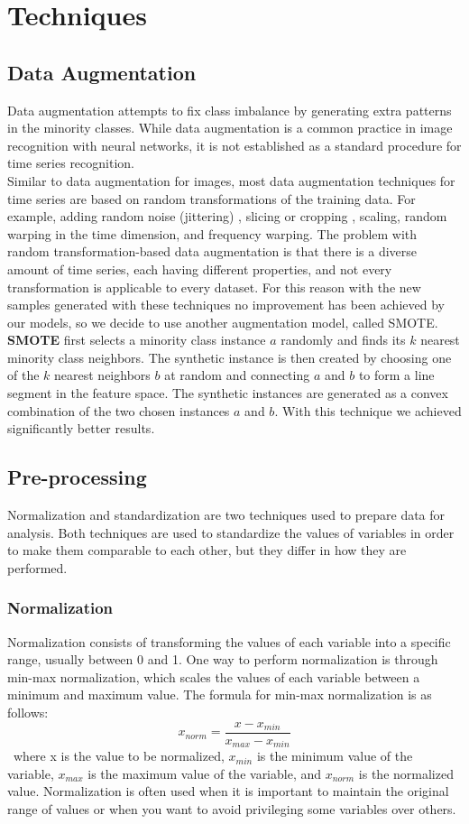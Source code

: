 \documentclass[11pt, oneside]{article}
\begin{document}
\section{Techniques}
\subsection{Data Augmentation}
Data augmentation attempts to fix class imbalance by generating extra patterns in the minority classes. While data augmentation is a common practice in image recognition with neural networks, it is not established as a standard procedure for time series recognition.\\ 
Similar to data augmentation for images, most data augmentation techniques for time series are based on random transformations of the training data. For example, adding random noise (jittering) , slicing or cropping , scaling, random warping in the time dimension, and frequency warping. The problem with random transformation-based data augmentation is that there is a diverse amount of time series, each having different properties, and not every transformation is applicable to every dataset. For this reason with the new samples generated with these techniques no improvement has been achieved by our models, so we decide to use another augmentation model, called SMOTE.\\  
\textbf{SMOTE} first selects a minority class instance $a$ randomly and finds its $k$ nearest minority class neighbors. The synthetic instance is then created by choosing one of the $k$ nearest neighbors $b$ at random and connecting $a$ and $b$ to form a line segment in the feature space. The synthetic instances are generated as a convex combination of the two chosen instances $a$ and $b$. With this technique we achieved significantly better results.

\subsection{Pre-processing}
Normalization and standardization are two techniques used to prepare data for analysis. Both techniques are used to standardize the values of variables in order to make them comparable to each other, but they differ in how they are performed.
\subsubsection{Normalization}
Normalization consists of transforming the values of each variable into a specific range, usually between 0 and 1. One way to perform normalization is through min-max normalization, which scales the values of each variable between a minimum and maximum value. The formula for min-max normalization is as follows:
\[ x_{norm} = \frac{x - x_{min}}{x_{max} - x_{min}} \]\
where x is the value to be normalized, $x_{min}$ is the minimum value of the variable, $x_{max}$ is the maximum value of the variable, and $x_{norm}$ is the normalized value.
Normalization is often used when it is important to maintain the original range of values or when you want to avoid privileging some variables over others.
\end{document}

